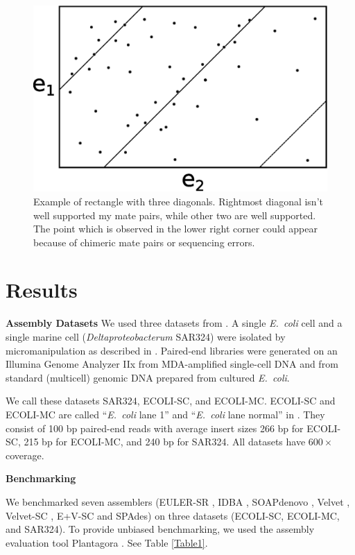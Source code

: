 \documentclass[a4paper]{article}
\def\ecoli{\emph{E.~coli}}
\def\spades{SPAdes}
\begin{document}
\begin{figure}
\begin{center}
\includegraphics[scale=0.5]{fig/rectangle.eps}
\caption{Example of rectangle with three diagonals. Rightmost diagonal isn't well supported my mate pairs, while other two are well supported. The point which is observed in the lower right corner could appear because of chimeric mate pairs or sequencing errors.}
\end{center}
\end{figure}


\section{Results}

\textbf{Assembly Datasets}
We used three datasets from \cite{Chitsaz2011}.
A single {\ecoli} cell
and a single marine cell ({\em Deltaproteobacterum} SAR324)
were isolated by micromanipulation as described in \cite{Ishoey2008}.
Paired-end libraries were generated on an Illumina Genome Analyzer IIx from MDA-amplified single-cell DNA
and from standard (multicell) genomic DNA prepared from cultured {\ecoli}.

We call these datasets SAR324, ECOLI-SC, and ECOLI-MC.
ECOLI-SC and ECOLI-MC are called ``{\ecoli} lane 1'' and ``{\ecoli} lane normal'' in \cite{Chitsaz2011}.
They consist of 100 bp paired-end reads
with average insert sizes 266 bp for ECOLI-SC, 215 bp for ECOLI-MC,
and 240 bp for SAR324.
All datasets have $600\times$ coverage.

\textbf{Benchmarking}

We benchmarked seven assemblers
(EULER-SR \cite{Chaisson08}, IDBA \cite{Peng10}, SOAPdenovo \cite{Li10}, Velvet \cite{Zerbino08}, Velvet-SC \cite{Chitsaz2011}, E+V-SC \cite{Chitsaz2011} and {\spades}) on three datasets
(ECOLI-SC, ECOLI-MC, and SAR324). To provide unbiased
benchmarking, we used the assembly evaluation tool Plantagora \cite{Barthelson2011}. See Table \ref{Table1}.
\end{document}
